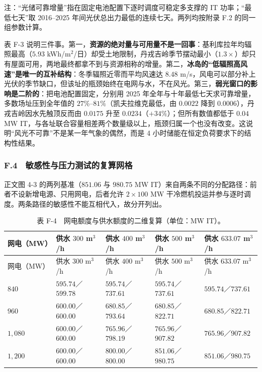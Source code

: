 \noindent 注：“光储可靠增量”指在固定电池配置下逐时调度可稳定多支撑的 IT 功率；“最低七天”取 2016–2025 年间光伏总出力最低的连续七天。两列均按附录 F.2 的同一组参数计算。

表 F-3 说明三件事。第一，\textbf{资源的绝对量与可用量不是一回事}：基利库拉年均辐照最高（$5.93$ kWh/m$^2$/日）却受土地限制，丹戎吉岭季节摆动最小（$1.3\times$）却只有屋面可用，两地最终都拿不到与资源相称的增量。第二，\textbf{冰岛的“低辐照高风速”是唯一的互补结构}：冬季辐照近零而平均风速达 $8.48$ m/s，风电可以部分补上光伏的季节缺口，但该址的瓶颈始终在电网与水，不在风光。第三，\textbf{弱光窗口的影响是二阶的}：把电池配置固定，分别用 2025 年全年与十年最低七天求可靠增量，多数场址压到全年值的 $27\%$–$81\%$（凯夫拉维克最低，由 $0.0022$ 降到 $0.0006$），丹戎吉岭因水先触顶反而由 $0.0175$ 升至 $0.0234$（$+34\%$）；但所有数值都低于 $0.04$ MW IT，与各址联合容量相差两个数量级以上，瓶颈归属一个也没有改变。这说明“风光不可靠”不是某一年气象的偶然，而是 4 小时储能在恒定负荷要求下的结构性结果。

\subsubsection{F.4　敏感性与压力测试的复算网格}

正文图 4-3 的两列基准（$851.06$ 与 $980.75$ MW IT）来自两条不同的分配路径：前者不设新增电源、只用网电，后者允许 $2\times100$ MW 干冷燃机投运并参与逐时调度。两条路径的敏感性不能互相代入，故分开列出。

{\footnotesize
\begin{longtable}{@{}>{\raggedright\arraybackslash}p{}>{\raggedright\arraybackslash}p{}>{\raggedright\arraybackslash}p{}>{\raggedright\arraybackslash}p{}>{\raggedright\arraybackslash}p{}@{}}
\caption{表 F-4　网电额度与供水额度的二维复算（单位：MW IT）。}\label{tab:F-4}\\
\toprule
网电（MW） & 供水 $300$ m$^3$/h & 供水 $400$ m$^3$/h & 供水 $500$ m$^3$/h & 供水 $633.07$ m$^3$/h \\
\midrule
\endfirsthead
\toprule
网电（MW） & 供水 $300$ m$^3$/h & 供水 $400$ m$^3$/h & 供水 $500$ m$^3$/h & 供水 $633.07$ m$^3$/h \\
\midrule
\endhead
\bottomrule
\endlastfoot
$840$ & $595.74$／$599.78$ & $595.74$／$737.61$ & $595.74$／$737.61$ & $595.74$／$737.61$ \\
$960$ & $600.00$／$600.00$ & $680.85$／$793.64$ & $680.85$／$822.71$ & $680.85$／$822.71$ \\
$1{,}080$ & $600.00$／$600.00$ & $765.96$／$798.19$ & $765.96$／$907.82$ & $765.96$／$907.82$ \\
$1{,}200$ & $600.00$／$600.00$ & $800.00$／$800.00$ & $851.06$／$980.75$ & $851.06$／$980.75$ \\
\end{longtable}
}


